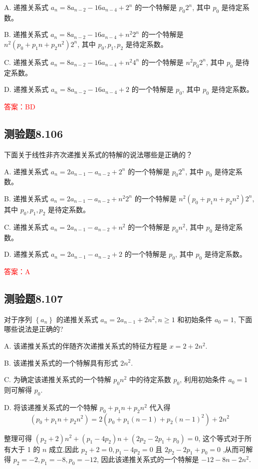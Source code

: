 \documentclass[UTF8, heading=true]{ctexart}
\begin{document}
A. 递推关系式 $a_n=8 a_{n-2}-16 a_{n-4}+2^n$ 的一个特解是 $p_0 2^n$, 其中 $p_0$ 是待定系数。

B. 递推关系式 $a_n=8 a_{n-2}-16 a_{n-4}+n^2 2^n$ 的一个特解是 $n^2\left(p_0+p_1 n+p_2 n^2\right) 2^n$, 其中 $p_0, p_1, p_2$ 是待定系数。

C. 递推关系式 $a_n=8 a_{n-2}-16 a_{n-4}+n^2 4^n$ 的一个特解是 $n^2 p_0 2^n$, 其中 $p_0$ 是待定系数。

D. 递推关系式 $a_n=8 a_{n-2}-16 a_{n-4}+2$ 的一个特解是 $p_0$, 其中 $p_0$ 是待定系数。

\textcolor{red}{答案：BD}

\subsection{测验题8.106}

下面关于线性非齐次递推关系式的特解的说法哪些是正确的？

A. 递推关系式 $a_n=2 a_{n-1}-a_{n-2}+2^n$ 的一个特解是 $p_0 2^n$, 其中 $p_0$ 是待定系数。

B. 递推关系式 $a_n=2 a_{n-1}-a_{n-2}+n^2 2^n$ 的一个特解是 $n^2\left(p_0+p_1 n+p_2 n^2\right) 2^n$, 其中 $p_0, p_1, p_2$ 是待定系数。

C. 递推关系式 $a_n=2 a_{n-1}-a_{n-2}+n^2$ 的一个特解是 $p_0 n^2$, 其中 $p_0$ 是待定系数。

D. 递推关系式 $a_n=2 a_{n-1}-a_{n-2}+2$ 的一个特解是 $p_0$, 其中 $p_0$ 是待定系数。

\textcolor{red}{答案：A}

\subsection{测验题8.107}
对于序列 $\left\{a_n\right\}$ 的递推关系式 $a_n=2 a_{n-1}+2 n^2, n \geq 1$ 和初始条件 $a_0=1$, 下面哪些说法是正确的?

A. 该递推关系式的伴随齐次递推关系式的特征方程是 $x=2+2 n^2$.

B. 该递推关系式的一个特解具有形式 $2 n^2$.

C. 为确定该递推关系式的一个特解 $p_0 n^2$ 中的待定系数 $p_0$, 利用初始条件 $a_0=1$ 则可解得 $p_0$.

D. 将该递推关系式的一个特解 $p_0+p_1 n+p_2 n^2$ 代入得
$$
\left(p_0+p_1 n+p_2 n^2\right)=2\left(p_0+p_1(n-1)+p_2(n-1)^2\right)+2 n^2
$$

整理可得 $\left(p_2+2\right) n^2+\left(p_1-4 p_2\right) n+\left(2 p_2-2 p_1+p_0\right)=0$, 这个等式对于所有大于 1 的 $n$ 成立,因此 $p_2+2=0, p_1-4 p_2=0$ 且 $2 p_2-2 p_1+p_0=0$ ,从而可解得 $p_2=-2, p_1=-8, p_0=-12$, 因此该递推关系式的一个特解是 $-12-8 n-2 n^2$.
\end{document}
